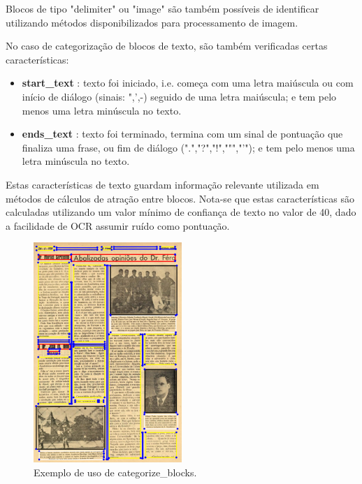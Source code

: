 Blocos de tipo "delimiter" ou "image" são também possíveis de identificar utilizando métodos disponibilizados para processamento de imagem.

No caso de categorização de blocos de texto, são também verificadas certas características:
\begin{itemize}\setlength\itemsep{-0.3em}
	\vspace{-0.5em}
	\item \textbf{start\_text} : texto foi iniciado, i.e. começa com uma letra maiúscula ou com início de diálogo (sinais: ",',-) seguido de uma letra maiúscula; e tem pelo menos uma letra minúscula no texto.
	\item \textbf{ends\_text} : texto foi terminado, termina com um sinal de pontuação que finaliza uma frase, ou fim de diálogo (".","?","!",""","'"); e tem pelo menos uma letra minúscula no texto.
\end{itemize}

Estas características de texto guardam informação relevante utilizada em métodos de cálculos de atração entre blocos. Nota-se que estas características são calculadas utilizando um valor mínimo de confiança de texto no valor de 40, dado a facilidade de OCR assumir ruído como pontuação.



\begin{figure}[H]
	\centering
	\includegraphics[width=0.5\textwidth]{images/ilustracoes/categorize_blocks.png}
	\caption{Exemplo de uso de categorize\_blocks.}
	\label{fig:categorize_blocks}
\end{figure}



